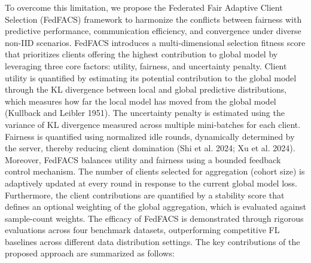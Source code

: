 \documentclass[pdflatex,sn-mathphys-num,oneside]{sn-jnl}%
\theoremstyle{thmstyleone}%
\theoremstyle{thmstyletwo}%
\theoremstyle{thmstylethree}%
\begin{document}
To overcome this limitation, we propose the Federated Fair Adaptive Client Selection (FedFACS) framework to harmonize the conflicts between fairness with predictive performance, communication efficiency, and convergence under diverse non-IID scenarios. FedFACS introduces a multi-dimensional selection fitness score that prioritizes clients offering the highest contribution to global model by leveraging three core factors: utility, fairness, and uncertainty penalty. Client utility is quantified by estimating its potential contribution to the global model through the KL divergence between local and global predictive distributions, which measures how far the local model has moved from the global model (Kullback and Leibler 1951). The uncertainty penalty is estimated using the variance of KL divergence measured across multiple mini-batches for each client. Fairness is quantified using normalized idle rounds, dynamically determined by the server, thereby reducing client domination (Shi et al. 2024; Xu et al. 2024). Moreover, FedFACS balances utility and fairness using a bounded feedback control mechanism. The number of clients selected for aggregation (cohort size) is adaptively updated at every round in response to the current global model loss. Furthermore, the client contributions are quantified by a stability score that defines an optional weighting of the global aggregation, which is evaluated against sample-count weights. The efficacy of FedFACS is demonstrated through rigorous evaluations across four benchmark datasets, outperforming competitive FL baselines across different data distribution settings. The key contributions of the proposed approach are summarized as follows:
\end{document}
